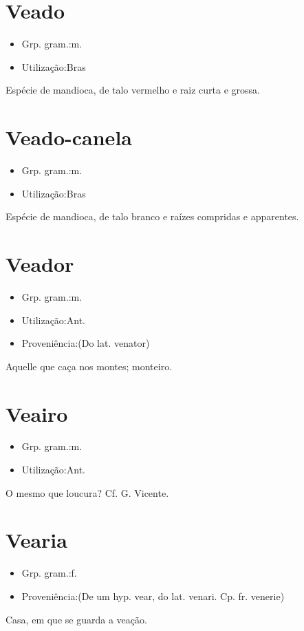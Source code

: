 \documentclass{article}
\begin{document}
\section{Veado}
\begin{itemize}
\item {Grp. gram.:m.}
\end{itemize}
\begin{itemize}
\item {Utilização:Bras}
\end{itemize}
Espécie de mandioca, de talo vermelho e raiz curta e grossa.
\section{Veado-canela}
\begin{itemize}
\item {Grp. gram.:m.}
\end{itemize}
\begin{itemize}
\item {Utilização:Bras}
\end{itemize}
Espécie de mandioca, de talo branco e raízes compridas e apparentes.
\section{Veador}
\begin{itemize}
\item {Grp. gram.:m.}
\end{itemize}
\begin{itemize}
\item {Utilização:Ant.}
\end{itemize}
\begin{itemize}
\item {Proveniência:(Do lat. \textunderscore venator\textunderscore )}
\end{itemize}
Aquelle que caça nos montes; monteiro.
\section{Veairo}
\begin{itemize}
\item {Grp. gram.:m.}
\end{itemize}
\begin{itemize}
\item {Utilização:Ant.}
\end{itemize}
O mesmo que \textunderscore loucura\textunderscore ? Cf. G. Vicente.
\section{Vearia}
\begin{itemize}
\item {Grp. gram.:f.}
\end{itemize}
\begin{itemize}
\item {Proveniência:(De um hyp. \textunderscore vear\textunderscore , do lat. \textunderscore venari\textunderscore . Cp. fr. \textunderscore venerie\textunderscore )}
\end{itemize}
Casa, em que se guarda a veação.
\end{document}
